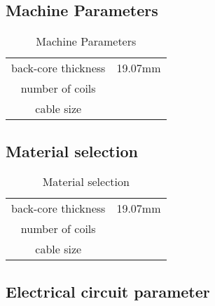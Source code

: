 \documentclass [a4 paper, 11pt, titlepage] {article}
\begin{document}
	
	
	
	
	\subsection{Machine Parameters}
		\begin{table}[h]
		\begin{center}
			\begin{tabular}{c|c}
				 &  \\
				\hline
				back-core thickness & 19.07mm \\
				number of coils & \\
				cable size & 
			\end{tabular}
		\end{center}
		\caption{Machine Parameters}
		\label{tab:machineParameters}
	\end{table}
	
	
	
	
	
	
	
	
	
	\subsection{Material selection}
		\begin{table}[h]
		\begin{center}
			\begin{tabular}{c|c}
				 &  \\
				\hline
				back-core thickness & 19.07mm \\
				number of coils & \\
				cable size & 
			\end{tabular}
		\end{center}
		\caption{Material selection}
		\label{tab:materialSelection}
	\end{table}
	
	
	
	
	
	
	
	
	\subsection{Electrical circuit parameter}
	
	

	

	

	

	
	
	
	
\end{document}
